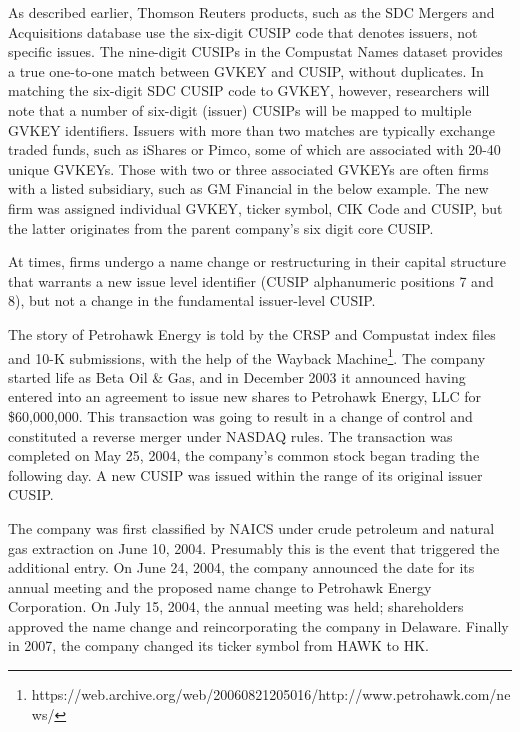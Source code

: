 \documentclass[12pt]{article}
\begin{document}
As described earlier, Thomson Reuters products, such as the SDC Mergers and Acquisitions database use the six-digit CUSIP code that denotes issuers, not specific issues.
The nine-digit CUSIPs in the Compustat Names dataset provides a true one-to-one match between GVKEY and CUSIP, without duplicates.
In matching the six-digit SDC CUSIP code to GVKEY, however, researchers will note that a number of six-digit (issuer) CUSIPs will be mapped to multiple GVKEY identifiers.
Issuers with more than two matches are typically exchange traded funds, such as iShares or Pimco, some of which are associated with 20-40 unique GVKEYs.
Those with two or three associated GVKEYs are often firms with a listed subsidiary, such as GM Financial in the below example.
The new firm was assigned individual GVKEY, ticker symbol, CIK Code and CUSIP, but the latter originates from the parent company's six digit core CUSIP.

\begin{center}

\end{center}

At times, firms undergo a name change or restructuring in their capital structure that warrants a new issue level identifier (CUSIP alphanumeric positions 7 and 8), but not a change in the fundamental issuer-level CUSIP.

The story of Petrohawk Energy is told by the CRSP and Compustat index files and 10-K submissions, with the help of the Wayback Machine\footnote{https://web.archive.org/web/20060821205016/http://www.petrohawk.com/news/}.
The company started life as Beta Oil \& Gas, and in December 2003 it announced having entered into an agreement to issue new shares to Petrohawk Energy, LLC for \$60,000,000.
This transaction was going to result in a change of control and constituted a reverse merger under NASDAQ rules.
The transaction was completed on May 25, 2004, the company's common stock began trading the following day.
A new CUSIP was issued within the range of its original issuer CUSIP.

The company was first classified by NAICS under crude petroleum and natural gas extraction on June 10, 2004.
Presumably this is the event that triggered the additional entry. 
On June 24, 2004, the company announced the date for its annual meeting and the proposed name change to Petrohawk Energy Corporation.
On July 15, 2004, the annual meeting was held; shareholders approved the name change and reincorporating the company in Delaware.
Finally in 2007, the company changed its ticker symbol from HAWK to HK.
\end{document}
